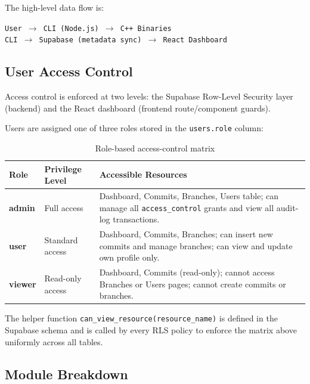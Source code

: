 \documentclass{article}
\begin{document}
The high-level data flow is:

\begin{center}
\texttt{User $\rightarrow$ CLI (Node.js) $\rightarrow$ C++ Binaries}\\[0.3em]
\texttt{CLI $\rightarrow$ Supabase (metadata sync) $\rightarrow$ React Dashboard}
\end{center}

\subsection{User Access Control}

Access control is enforced at two levels: the Supabase Row-Level Security
layer (backend) and the React dashboard (frontend route/component guards).

Users are assigned one of three roles stored in the \texttt{users.role}
column:

\begin{table}[htbp]
\centering
\renewcommand{\arraystretch}{1.4}
\begin{tabular}{l l p{7.5cm}}
\toprule
Role & Privilege Level & Accessible Resources \\
\midrule
\textbf{admin}
    & Full access
    & Dashboard, Commits, Branches, Users table; can manage all
      \texttt{access\_control} grants and view all audit-log
      transactions. \\
\textbf{user}
    & Standard access
    & Dashboard, Commits, Branches; can insert new commits and manage
      branches; can view and update own profile only. \\
\textbf{viewer}
    & Read-only access
    & Dashboard, Commits (read-only); cannot access Branches or Users
      pages; cannot create commits or branches. \\
\bottomrule
\end{tabular}
\caption{Role-based access-control matrix}
\label{tab:rbac}
\end{table}

The helper function \texttt{can\_view\_resource(resource\_name)} is
defined in the Supabase schema and is called by every RLS policy to
enforce the matrix above uniformly across all tables.

\subsection{Module Breakdown}
\end{document}
